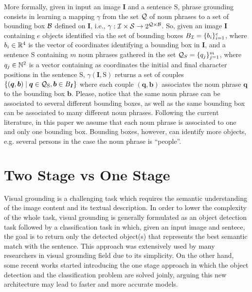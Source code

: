 More formally, given in input an image $\bm{I}$ and a sentence
$\mathrm{S}$, phrase grounding consists in learning a mapping $\gamma$
from the set $\mathcal{Q}$ of noun phrases to a set of bounding box $\mathcal{B}$
defined on $\bm{I}$, i.e., $\gamma : \mathcal{I} \times \mathcal{S} \rightarrow
2^{\mathcal{Q} \times \mathcal{B}}$. So, given an image $\bm{I}$ containing $e$
objects identified via the set of bounding boxes $B_{\mathcal{I}} = \{ b_i
\}^e_{i=1}$, where $b_i \in \mathbb{R}^4$ is the vector of coordinates
identifying a bounding box in $\bm{I}$, and a sentence $\mathrm{S}$
containing $m$ noun phrases gathered in the set $\mathcal{Q}_S = \{ q_j
\}^m_{j=1}$, where $q_j \in \mathbb{N}^2$ is a vector containing as
coordinates the initial and final character positions in the sentence
$\mathrm{S}$, $\gamma(\bm{I}, \mathrm{S})$ returns a set of couples
$\{ (\bm{q}, \bm{b}) \mid \bm{q} \in \mathcal{Q}_{\mathrm{S}}, \bm{b} \in
B_{\bm{I}} \}$ where each couple $(\bm{q}, \bm{b})$ associates the
noun phrase $\bm{q}$ to the bounding box $\bm{b}$. Please, notice that
the same noun phrase can be associated to several different bounding
boxes, as well as the same bounding box can be associated to many
different noun phrases. Following the current literature, in this
paper we assume that each noun phrase is associated to one and only
one bounding box. Bounding boxes, however, can identify more objects,
e.g. several persons in the case the noun phrase is ``people''.

\section{Two Stage vs One Stage}
\label{sec:two-stage-vs-one-stage}

Visual grounding is a challenging task which requires the semantic
understanding of the image content and its textual description. In
order to lower the complexity of the whole task, visual grounding is
generally formulated as an object detection task followed by a
classification task in which, given an input image and sentece, the
goal is to return only the detected object(s) that represents the best
semantic match with the sentence. This approach was extensively used
by many researchers in visual grounding field
\cite{rohrbach2016grounding, xiao2017weakly, akbari2019multi, chen2018knowledge, datta2019align2ground, wang2020maf}
due to its simplicity. On the other hand, some recent works started
introducing the one stage approach \cite{yang2019fast,sadhu2019zero}
in which the object detection and the classification problem are
solved joinly, arguing this new architecture may lead to faster and
more accurate models.

